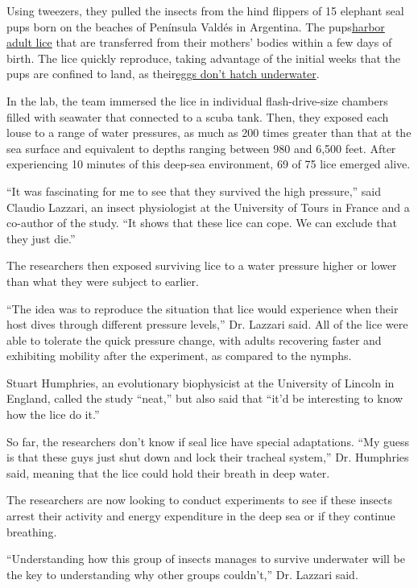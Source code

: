 Using tweezers, they pulled the insects from the hind flippers of 15
elephant seal pups born on the beaches of Península Valdés in Argentina.
The pups\href{https://www.publish.csiro.au/zo/ZO9650437}{harbor adult
lice} that are transferred from their mothers' bodies within a few days
of birth. The lice quickly reproduce, taking advantage of the initial
weeks that the pups are confined to land, as
their\href{https://www.publish.csiro.au/zo/ZO9650437}{eggs don't hatch
underwater}.

In the lab, the team immersed the lice in individual flash-drive-size
chambers filled with seawater that connected to a scuba tank. Then, they
exposed each louse to a range of water pressures, as much as 200 times
greater than that at the sea surface and equivalent to depths ranging
between 980 and 6,500 feet. After experiencing 10 minutes of this
deep-sea environment, 69 of 75 lice emerged alive.

``It was fascinating for me to see that they survived the high
pressure,'' said Claudio Lazzari, an insect physiologist at the
University of Tours in France and a co-author of the study. ``It shows
that these lice can cope. We can exclude that they just die.''

The researchers then exposed surviving lice to a water pressure higher
or lower than what they were subject to earlier.

``The idea was to reproduce the situation that lice would experience
when their host dives through different pressure levels,'' Dr. Lazzari
said. All of the lice were able to tolerate the quick pressure change,
with adults recovering faster and exhibiting mobility after the
experiment, as compared to the nymphs.

Stuart Humphries, an evolutionary biophysicist at the University of
Lincoln in England, called the study ``neat,'' but also said that ``it'd
be interesting to know how the lice do it.''

So far, the researchers don't know if seal lice have special
adaptations. ``My guess is that these guys just shut down and lock their
tracheal system,'' Dr. Humphries said, meaning that the lice could hold
their breath in deep water.

The researchers are now looking to conduct experiments to see if these
insects arrest their activity and energy expenditure in the deep sea or
if they continue breathing.

``Understanding how this group of insects manages to survive underwater
will be the key to understanding why other groups couldn't,'' Dr.
Lazzari said.

